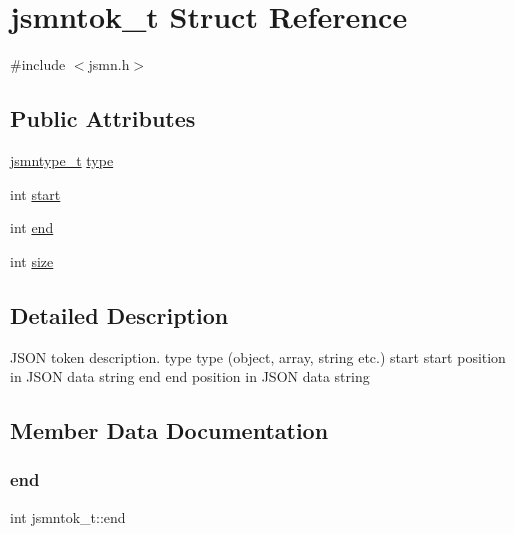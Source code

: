 \hypertarget{structjsmntok__t}{}\section{jsmntok\+\_\+t Struct Reference}
\label{structjsmntok__t}


{\ttfamily \#include $<$jsmn.\+h$>$}

\subsection*{Public Attributes}
\begin{DoxyCompactItemize}
\item 
\hyperlink{include_2jsmn_8h_a065320719769f9dc1fbe30094e52802f}{jsmntype\+\_\+t} \hyperlink{structjsmntok__t_ac03dbd6b83cbcd979eb64702d5b9943e}{type}
\item 
int \hyperlink{structjsmntok__t_a0a8f55d0095f268ce8e224fe1234acd0}{start}
\item 
int \hyperlink{structjsmntok__t_ab49e0369f39e9b6174141e7f5bde5996}{end}
\item 
int \hyperlink{structjsmntok__t_a8ac3694b7335456c8e602197778883db}{size}
\end{DoxyCompactItemize}


\subsection{Detailed Description}
J\+S\+ON token description. type type (object, array, string etc.) start start position in J\+S\+ON data string end end position in J\+S\+ON data string 

\subsection{Member Data Documentation}
\mbox{\label{structjsmntok__t_ab49e0369f39e9b6174141e7f5bde5996}} 
\subsubsection{\texorpdfstring{end}{end}}
{\footnotesize\ttfamily int jsmntok\+\_\+t\+::end}

\mbox{\label{structjsmntok__t_a8ac3694b7335456c8e602197778883db}} 
